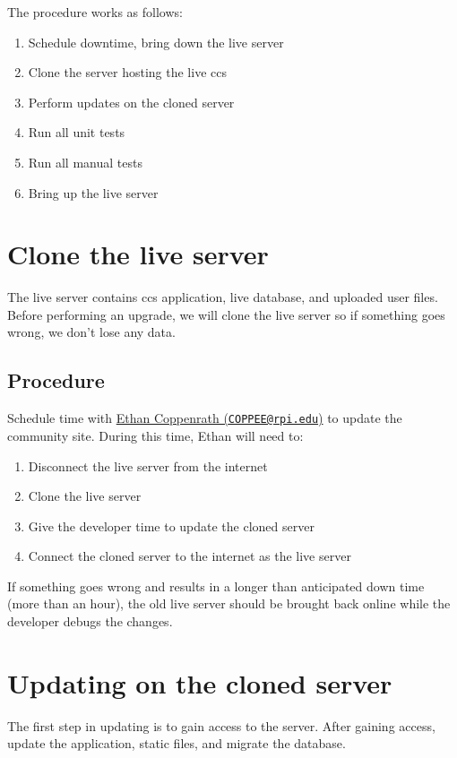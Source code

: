 \documentclass{article}
\begin{document}
The procedure works as follows:
\begin{enumerate}
 \item Schedule downtime, bring down the live server
 \item Clone the server hosting the live \ac{ccs}
 \item Perform updates on the cloned server
 \item Run all unit tests
 \item Run all manual tests
 \item Bring up the live server
\end{enumerate}

\section{Clone the live server}

The live server contains \ac{ccs} application, live database, and uploaded user files.
Before performing an upgrade, we will clone the live server so if something goes wrong, we don't lose any data.

\subsection{Procedure}

Schedule time with \href{mailto:COPPEE@rpi.edu}{Ethan Coppenrath (\nolinkurl{COPPEE@rpi.edu})} to update the community site.
During this time, Ethan will need to:
\begin{enumerate}
 \item Disconnect the live server from the internet
 \item Clone the live server
 \item Give the developer time to update the cloned server
 \item Connect the cloned server to the internet as the live server
\end{enumerate}

If something goes wrong and results in a longer than anticipated down time (more than an hour), the old live server should be brought back online while the developer debugs the changes.

\section{Updating on the cloned server}

The first step in updating is to gain access to the server.
After gaining access, update the application, static files, and migrate the database.
\end{document}

